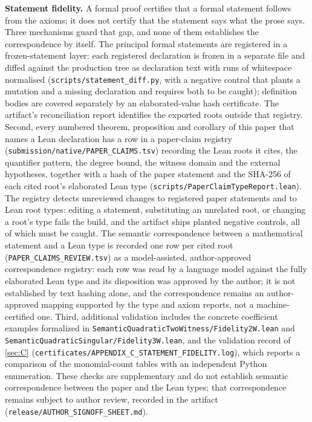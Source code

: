 \textbf{Statement fidelity.} A formal proof certifies that a formal statement follows from the axioms; it does not certify that the statement says what the prose says. Three mechanisms guard that gap, and none of them establishes the correspondence by itself. The principal formal statements are registered in a frozen-statement layer: each registered declaration is frozen in a separate file and diffed against the production tree as declaration text with runs of whitespace normalised (\texttt{scripts/statement\_\allowbreak{}diff.\allowbreak{}py}, with a negative control that plants a mutation and a missing declaration and requires both to be caught); definition bodies are covered separately by an elaborated-value hash certificate. The artifact's reconciliation report identifies the exported roots outside that registry. Second, every numbered theorem, proposition and corollary of this paper that names a Lean declaration has a row in a paper-claim registry (\texttt{submission/native/PAPER\_\allowbreak{}CLAIMS.\allowbreak{}tsv}) recording the Lean roots it cites, the quantifier pattern, the degree bound, the witness domain and the external hypotheses, together with a hash of the paper statement and the SHA-256 of each cited root's elaborated Lean type (\texttt{scripts/PaperClaimTypeReport.\allowbreak{}lean}). The registry detects unreviewed changes to registered paper statements and to Lean root types: editing a statement, substituting an unrelated root, or changing a root's type fails the build, and the artifact ships planted negative controls, all of which must be caught. The semantic correspondence between a mathematical statement and a Lean type is recorded one row per cited root (\texttt{PAPER\_\allowbreak{}CLAIMS\_\allowbreak{}REVIEW.\allowbreak{}tsv}) as a model-assisted, author-approved correspondence registry: each row was read by a language model against the fully elaborated Lean type and its disposition was approved by the author; it is not established by text hashing alone, and the correspondence remains an author-approved mapping supported by the type and axiom reports, not a machine-certified one. Third, additional validation includes the concrete coefficient examples formalized in \texttt{SemanticQuadraticTwoWitness/Fidelity2W.\allowbreak{}lean} and \texttt{SemanticQuadraticSingular/Fidelity3W.\allowbreak{}lean}, and the validation record of \cref{sec:C} (\texttt{certificates/APPENDIX\_\allowbreak{}C\_\allowbreak{}STATEMENT\_\allowbreak{}FIDELITY.\allowbreak{}log}), which reports a comparison of the monomial-count tables with an independent Python enumeration. These checks are supplementary and do not establish semantic correspondence between the paper and the Lean types; that correspondence remains subject to author review, recorded in the artifact (\texttt{release/AUTHOR\_\allowbreak{}SIGNOFF\_\allowbreak{}SHEET.\allowbreak{}md}).

